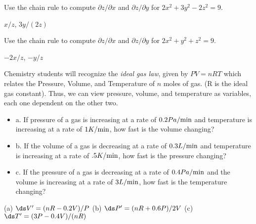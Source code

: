 \begin{theorem}
\begin{exercises}
\begin{exercise} Use the chain rule to compute $\partial z/\partial x$ and 
$\partial z/\partial y$ for $2x^2+3y^2-2z^2=9$.
\begin{answer} $x/z$, $3y/(2z)$
\end{answer}\end{exercise}

\begin{exercise} Use the chain rule to compute $\partial z/\partial x$ and 
$\partial z/\partial y$ for $2x^2+y^2+z^2=9$.
\begin{answer} $-2x/z$, $-y/z$
\end{answer}\end{exercise}



\begin{exercise} Chemistry students will recognize the {\em ideal gas law\/}, given
  by $PV=nRT$ which relates the Pressure, Volume, and Temperature of
  $n$ moles of gas.  (R is the ideal gas constant).  Thus, we can view
  pressure, volume, and temperature as variables, each one dependent
  on the other two.

\begin{itemize} %
\item{a.} If pressure of a gas is increasing at a rate of $0.2
  Pa/\hbox{min}$ and temperature is increasing at a rate of $1
  K/\hbox{min}$, how fast is the volume changing?
\item{b.} If the volume of a gas is decreasing at a rate of $0.3
  L/\hbox{min}$ and temperature is increasing at a rate of $.5
  K/\hbox{min}$, how fast is the pressure changing?
\item{c.} If the pressure of a gas is decreasing at a rate of $0.4
  Pa/\hbox{min}$ and the volume is increasing at a rate of $3
  L/\hbox{min}$, how fast is the temperature changing?
\end{itemize}
\begin{answer} (a) $\ds V'=(nR-0.2V)/P$\hfill\break
(b) $\ds P'=(nR+0.6P)/2V$\hfill\break
(c) $\ds T' = (3P-0.4V)/(nR)$
\end{answer}\end{exercise}


\end{exercises}
\end{theorem}
